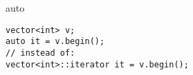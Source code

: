 \begin{frame}[fragile,label=auto]{auto}
\lstset{language=C++,style=small}
\begin{lstlisting}
vector<int> v;
auto it = v.begin(); 
// instead of:
vector<int>::iterator it = v.begin();
\end{lstlisting}
\end{frame}
